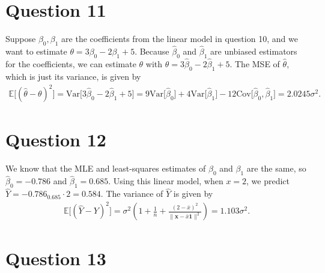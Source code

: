 \documentclass[10pt]{article}
\begin{document}
\section{Question 11} \noindent
Suppose \(\beta_0, \beta_1\) are the coefficients from the linear model in question 10, and we want to estimate \(\theta = 3 \beta_0 - 2 \beta_1 + 5\).
Because \(\hat{\beta}_0\) and \(\hat{\beta}_1\) are unbiased estimators for the coefficients, we can estimate \(\theta\)
with \(\hat{\theta} = 3 \hat{\beta}_0 - 2 \hat{\beta}_1 + 5\). The MSE of \(\hat{\theta}\), which is just its variance, is given by 
\begin{align*}
    \mathbb{E}\Big[ (\hat{\theta} - \theta)^2 \Big]
    = \mathrm{Var} \big[ 3 \hat{\beta}_0 - 2 \hat{\beta}_1 + 5 ] 
    = 9 \mathrm{Var}\big[ \hat{\beta}_0 \big] + 4 \mathrm{Var}\big[ \hat{\beta}_1 \big] - 12 \mathrm{Cov}\big[ \hat{\beta}_0, \hat{\beta}_1 \big]
    = 2.0245 \sigma^2.
\end{align*}

\section{Question 12} \noindent
We know that the MLE and least-squares estimates of \(\beta_0\) and \(\beta_1\) are the same, so \(\hat{\beta}_0 = -0.786\) and \(\hat{\beta}_1 = 0.685\).
Using this linear model, when \(x = 2\), we predict \(\hat{Y} = -0.786 _ 0.685 \cdot 2 = 0.584\). The variance of \(\hat{Y}\) is given by 
\begin{align*}
    \mathbb{E} \Big[ (\hat{Y} - Y)^2 \Big]
    = \sigma^2 \left( 1 + \frac{1}{n} + \frac{(2 - \bar{x})^2}{\| \mathbf{x} - \bar{x}\mathbf{1} \|^2} \right)
    = 1.103 \sigma^2.
\end{align*}

\section{Question 13} \noindent
\end{document}
